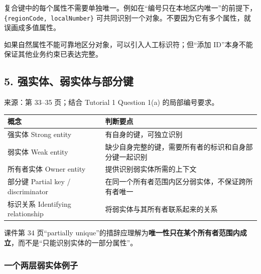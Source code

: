 复合键中的每个属性不需要单独唯一。例如在``编号只在本地区内唯一''的前提下，\texttt{\{regionCode,\ localNumber\}} 可共同识别一个对象。不要因为它有多个属性，就误画成多值属性。

如果自然属性不能可靠地区分对象，可以引入人工标识符；但``添加 ID''本身不能保证其他业务约束已表达完整。

\Needspace{11cm}
\subsection{5. 强实体、弱实体与部分键}\label{02_er_modelling_zh-ux5f3aux5b9eux4f53ux5f31ux5b9eux4f53ux4e0eux90e8ux5206ux952e}


来源：第 33--35 页；结合 Tutorial 1 Question 1(a) 的局部编号要求。

\begin{longtable}[]{@{}
  >{\raggedright\arraybackslash}p{}
  >{\raggedright\arraybackslash}p{}@{}}
\toprule\noalign{}
\begin{minipage}[b]{\linewidth}\raggedright
概念
\end{minipage} & \begin{minipage}[b]{\linewidth}\raggedright
判断要点
\end{minipage} \\
\midrule\noalign{}
\endhead
\bottomrule\noalign{}
\endlastfoot
强实体 Strong entity & 有自身的键，可独立识别 \\
弱实体 Weak entity & 缺少自身完整的键，需要所有者的标识和自身部分键一起识别 \\
所有者实体 Owner entity & 提供识别弱实体所需的上下文 \\
部分键 Partial key / discriminator & 在同一个所有者范围内区分弱实体，不保证跨所有者唯一 \\
标识关系 Identifying relationship & 将弱实体与其所有者联系起来的关系 \\
\end{longtable}

课件第 34 页``partially unique''的措辞应理解为\textbf{唯一性只在某个所有者范围内成立}，而不是``只能识别实体的一部分属性''。

\subsubsection{一个两层弱实体例子}\label{02_er_modelling_zh-ux4e00ux4e2aux4e24ux5c42ux5f31ux5b9eux4f53ux4f8bux5b50}

